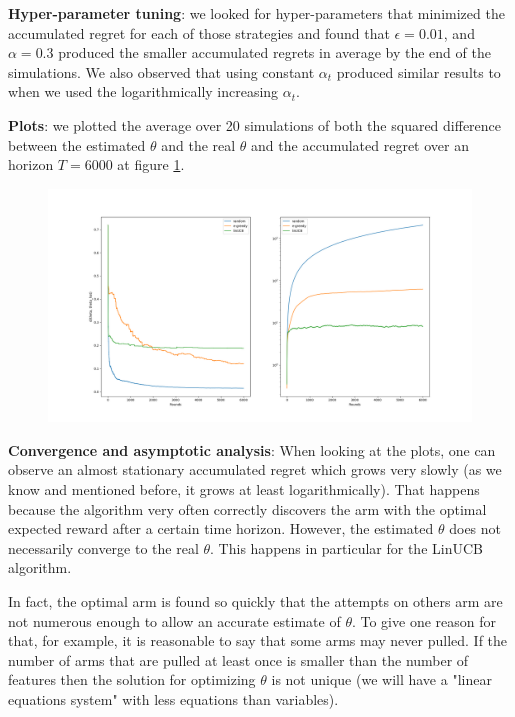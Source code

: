 \documentclass[a4paper]{article}
\begin{document}
\textbf{Hyper-parameter tuning}: we looked for hyper-parameters that minimized the accumulated regret for each of those strategies and found that $\epsilon = 0.01$, and $\alpha = 0.3$ produced the smaller accumulated regrets in average by the end of the simulations. We also observed that using constant $\alpha_t$ produced similar results to when we used the logarithmically increasing $\alpha_t$.

\textbf{Plots}: we plotted the average over 20 simulations of both the squared difference between the estimated $\theta$ and the real $\theta$ and the accumulated regret over an horizon $T = 6000$ at figure \ref{fig:real_data}.

\begin{figure}
\centering
\includegraphics[width=1\textwidth]{../img/Regret curves for linear bandit model on real data.png}
\caption{\label{fig:real_data}}
\end{figure}

\textbf{Convergence and asymptotic analysis}: When looking at the plots, one can observe an almost stationary accumulated regret which grows very slowly (as we know and mentioned before, it grows at least logarithmically). That happens because the algorithm very often correctly discovers the arm with the optimal expected reward after a certain time horizon. However, the estimated $\theta$ does not necessarily converge to the real $\theta$. This happens in particular for the LinUCB algorithm.

In fact, the optimal arm is found so quickly that the attempts on others arm are not numerous enough to allow an accurate estimate of $\theta$. To give one reason for that, for example, it is reasonable to say that some arms may never pulled. If the number of arms that are pulled at least once is smaller than the number of features then the solution for optimizing $\theta$ is not unique (we will have a "linear equations system" with less equations than variables).
\end{document}
